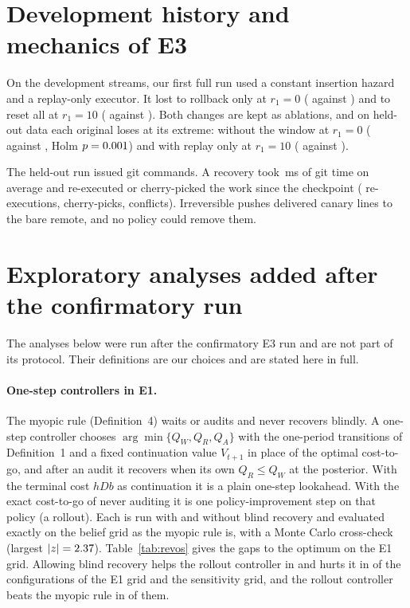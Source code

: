 \documentclass[11pt]{article}
\theoremstyle{definition}
\begin{document}
\section{Development history and mechanics of E3}

On the development streams, our first full run used a constant insertion hazard and a replay-only
executor. It lost to rollback only at $r_1=0$ (\EThreeVOneRoverZero{} against \EThreeVOneRollbackZero) and
to reset all at $r_1=10$ (\EThreeVOneRoverTen{} against \EThreeVOneResetTen). Both changes are kept as
ablations, and on held-out data each original loses at its extreme: without the window at $r_1=0$
(\EThreeLZeroConst{} against \EThreeLZeroRover, Holm $p=0.001$) and with replay only at $r_1=10$
(\EThreeLTenReplayOnly{} against \EThreeLTenRover).

The held-out run issued \EThreeGitCalls{} git commands. A recovery took \EThreeMsPerRecovery\,ms of git time
on average and re-executed or cherry-picked the work since the checkpoint (\EThreeRegen{} re-executions,
\EThreeCherry{} cherry-picks, \EThreeConflicts{} conflicts). Irreversible pushes delivered
\EThreeRemoteCanary{} canary lines to the bare remote, and no policy could remove them.

\section{Exploratory analyses added after the confirmatory run}

The analyses below were run after the confirmatory E3 run and are not part of its protocol. Their
definitions are our choices and are stated here in full.

\paragraph{One-step controllers in E1.} The myopic rule (Definition~4) waits or audits and never recovers
blindly. A one-step controller chooses $\arg\min\{Q_W,Q_R,Q_A\}$ with the one-period transitions of
Definition~1 and a fixed continuation value $V_{t+1}$ in place of the optimal cost-to-go,
and after an audit it recovers when its own $Q_R\le Q_W$ at the posterior. With the terminal cost
$hDb$ as continuation it is a plain one-step lookahead. With the exact cost-to-go of never auditing it is
one policy-improvement step on that policy (a rollout). Each is run with and without blind recovery and
evaluated exactly on the belief grid as the myopic rule is, with a Monte Carlo cross-check
(largest $|z|=2.37$). Table~\ref{tab:revos} gives the gaps to the optimum on the E1 grid. Allowing
blind recovery helps the rollout controller in \PostOsBlindHelps{} and hurts it in \PostOsBlindHurts{} of the
\PostOsCells{} configurations of the E1 grid and the sensitivity grid, and the rollout controller beats the
myopic rule in \PostOsRollBeats{} of them.
\end{document}
